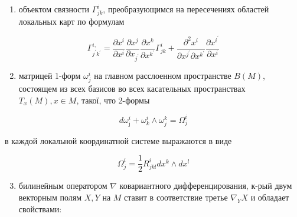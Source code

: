 \documentclass[10pt]{article}
\begin{document}
\begin{enumerate}

  \item объектом связности $\Gamma_{j k}^{i}$, преобразующимся на пересечениях областей локальных карт по формулам

\end{enumerate}



\[

\Gamma_{j^{\prime} k^{\prime}}^{i,}=\frac{\partial x^{i}}{\partial x^{i}} \frac{\partial x^{j}}{\partial x_{j^{\prime}}} \frac{\partial x^{k}}{\partial x^{k^{\prime}}} \Gamma_{j k}^{i}+\frac{\partial^{2} x^{i}}{\partial x^{j^{\prime}} \partial x^{k^{\prime}}} \frac{\partial x^{i^{\prime}}}{\partial x^{i}}

\]



\begin{enumerate}

  \setcounter{enumi}{1}

  \item матрицей 1-форм $\omega_{j}^{i}$ на главном расслоенном пространстве $B(M)$, состоящем из всех базисов во всех касательных пространствах $T_{x}(M), x \in M$, такої, что 2-формы

\end{enumerate}



\[

d \omega_{\mathrm{j}}^{i}+\omega_{k}^{i} \wedge \omega_{j}^{k}=\Omega_{j}^{i}

\]



в каждой локальной координатной системе выражаются в виде



\[

\Omega_{j}^{i}=\frac{1}{2} R_{j k l}^{i} d x^{k} \wedge d x^{l}

\]



\begin{enumerate}

  \setcounter{enumi}{2}

  \item билинейным оператором $\nabla$ ковариантного дифференцирования, к-рый двум векторным полям $X, Y$ на $M$ ставит в соответствие третье $\nabla_{Y} X$ и обладает свойствами:

\end{enumerate}
\end{document}
